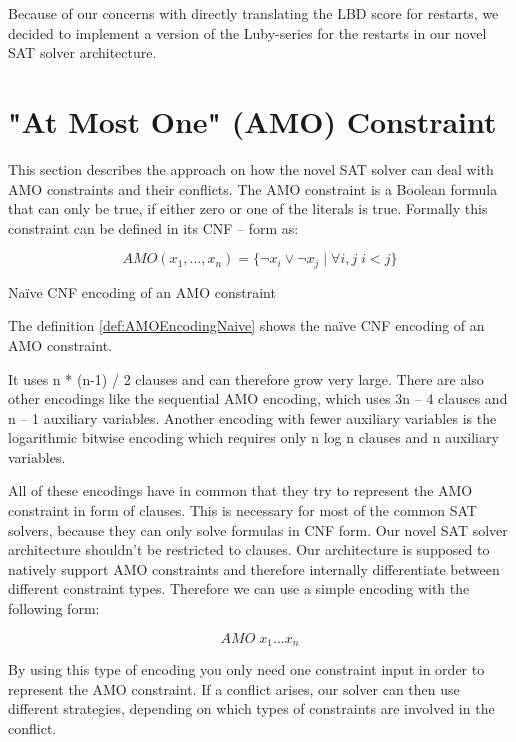 Because of our concerns with directly translating the LBD score for restarts, we decided to implement a version of the Luby-series for the restarts in our novel SAT solver architecture.

\section{"At Most One" (AMO) Constraint}
\label{sec:AMOConstraint}

This section describes the approach on how the novel SAT solver can deal with AMO constraints and their conflicts. The AMO constraint is a Boolean formula that can only be true, if either zero or one of the literals is true.  Formally this constraint can be defined in its CNF – form as:

\begin{definition}
\begin{leftbar}
\begin{displaymath}
AMO(x_1, ..., x_n)= \{\neg x_i \vee \neg x_j \; | \; \forall i, j \; i < j\}
\end{displaymath}
\end{leftbar}
\caption{Naïve CNF encoding of an AMO constraint}
\label{def:AMOEncodingNaive}
\end{definition}

The definition \ref{def:AMOEncodingNaive} shows the naïve CNF encoding of an AMO constraint. 

It uses n * (n-1) / 2 clauses and can therefore grow very large. There are also other encodings like the sequential AMO encoding, which uses 3n – 4 clauses and n – 1 auxiliary variables. Another encoding with fewer auxiliary variables is the logarithmic bitwise encoding which requires only n log n clauses and n auxiliary variables. 
\cite{chen2010new} 

All of these encodings have in common that they try to represent the AMO constraint in form of clauses. This is necessary for most of the common SAT solvers, because they can only solve formulas in CNF form. Our novel SAT solver architecture shouldn’t be restricted to clauses. Our architecture is supposed to natively support AMO constraints and therefore internally differentiate between different constraint types. Therefore we can use a simple encoding with the following form:

\begin{leftbar}
\begin{displaymath}
AMO \; x_1 ... x_n
\end{displaymath}
\end{leftbar}
By using this type of encoding you only need one constraint input in order to represent the AMO constraint. If a conflict arises, our solver can then use different strategies, depending on which types of constraints are involved in the conflict.

